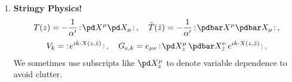 \documentclass[a4paper,10pt]{article}
\begin{document}
\maketitle
\pagestyle{headings}
\thispagestyle{empty}


	\begin{enumerate}
	\item \textbf{Stringy Physics!}
	\begin{gather}
		T(z)
		= - \frac{1}{\alpha'}\,
			\normorder{\pd X^\mu \pd X_\mu}\,,\quad
		\tilde{T}(\bar{z})
		= - \frac{1}{\alpha'}\,
			\normorder{\pdbar X^\mu \pdbar X_\mu}\,,
	\\[.5ex]
		V_k = \normorder{
				e^{ik\cdot X(z,\bar{z})}
			}\,,\quad
		G_{e,k} = e_{\mu\nu}\,\normorder{
				\pd X^\mu_z\,
				\pdbar X^\nu_{\bar{z}}\,
				e^{ik\cdot X(z,\bar{z})}
			}\,,
	\end{gather}
	We sometimes use subscripts like $
		\pd X^\mu_z
	$ to denote variable dependence to avoid clutter. 
	

\end{enumerate}
\end{document}

